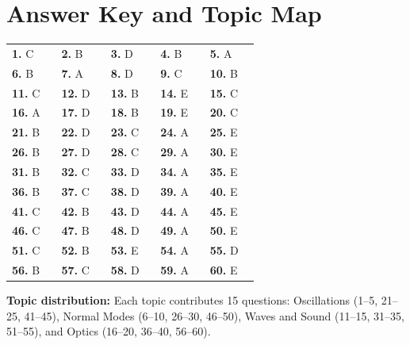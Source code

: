 \documentclass[10pt,a4paper]{physicsquiz}
\begin{document}
\section{Answer Key and Topic Map}
\begin{answerkey}
  \centering
  \renewcommand{\arraystretch}{1.35}
  \begin{tabular}{*{5}{>{\centering\arraybackslash}p{0.16\linewidth}}}
    \toprule
    \textbf{1.} C  & \textbf{2.} B  & \textbf{3.} D  & \textbf{4.} B  & \textbf{5.} A  \\
    \textbf{6.} B  & \textbf{7.} A  & \textbf{8.} D  & \textbf{9.} C  & \textbf{10.} B \\
    \textbf{11.} C & \textbf{12.} D & \textbf{13.} B & \textbf{14.} E & \textbf{15.} C \\
    \textbf{16.} A & \textbf{17.} D & \textbf{18.} B & \textbf{19.} E & \textbf{20.} C \\
    \textbf{21.} B & \textbf{22.} D & \textbf{23.} C & \textbf{24.} A & \textbf{25.} E \\
    \textbf{26.} B & \textbf{27.} D & \textbf{28.} C & \textbf{29.} A & \textbf{30.} E \\
    \textbf{31.} B & \textbf{32.} C & \textbf{33.} D & \textbf{34.} A & \textbf{35.} E \\
    \textbf{36.} B & \textbf{37.} C & \textbf{38.} D & \textbf{39.} A & \textbf{40.} E \\
    \textbf{41.} C & \textbf{42.} B & \textbf{43.} D & \textbf{44.} A & \textbf{45.} E \\
    \textbf{46.} C & \textbf{47.} B & \textbf{48.} D & \textbf{49.} A & \textbf{50.} E \\
    \textbf{51.} C & \textbf{52.} B & \textbf{53.} E & \textbf{54.} A & \textbf{55.} D \\
    \textbf{56.} B & \textbf{57.} C & \textbf{58.} D & \textbf{59.} A & \textbf{60.} E \\
    \bottomrule
  \end{tabular}
\end{answerkey}

\begin{tcolorbox}[colback=QuizLightGrey,colframe=QuizGrey,arc=2mm,boxrule=0.6pt]
  \textbf{Topic distribution:} Each topic contributes 15 questions: Oscillations (1--5, 21--25, 41--45), Normal Modes (6--10, 26--30, 46--50), Waves and Sound (11--15, 31--35, 51--55), and Optics (16--20, 36--40, 56--60).
\end{tcolorbox}

\clearpage
\end{document}
